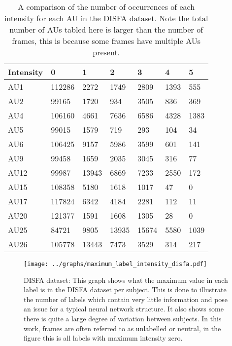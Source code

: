     \begin{table}[h!]
    \centering

    \begin{tabular}{lllllll}
    \hline
    Intensity & 0      & 1     & 2     & 3     & 4    & 5    \\ \hline
    AU1       & 112286 & 2272  & 1749  & 2809  & 1393 & 555  \\
    AU2       & 99165  & 1720  & 934   & 3505  & 836  & 369  \\
    AU4       & 106160 & 4661  & 7636  & 6586  & 4328 & 1383 \\
    AU5       & 99015  & 1579  & 719   & 293   & 104  & 34   \\
    AU6       & 106425 & 9157  & 5986  & 3599  & 601  & 141  \\
    AU9       & 99458  & 1659  & 2035  & 3045  & 316  & 77   \\
    AU12      & 99987  & 13943 & 6869  & 7233  & 2550 & 172  \\
    AU15      & 108358 & 5180  & 1618  & 1017  & 47   & 0    \\
    AU17      & 117824 & 6342  & 4184  & 2281  & 112  & 11   \\
    AU20      & 121377 & 1591  & 1608  & 1305  & 28   & 0    \\
    AU25      & 84721  & 9805  & 13935 & 15674 & 5580 & 1039 \\
    AU26      & 105778 & 13443 & 7473  & 3529  & 314  & 217  \\ \hline
    \end{tabular}
    \caption{A comparison of the number of occurrences of each intensity for each AU in the DISFA dataset. Note the total number
    of AUs tabled here is larger than the number of frames, this is because some frames have multiple AUs present.} \label{compau}
    \end{table}


    \begin{figure}[h!]
      \texttt{[image: ../graphs/maximum\_label\_intensity\_disfa.pdf]}
      \caption{DISFA dataset: This graph shows what the maximum value in each label is in the DISFA dataset per subject. This
      is done to illustrate the number of labels which contain very little information
      and pose an issue for a typical neural network structure. It also shows some there
      is quite a large degree of variation between subjects. In this work, frames are often referred to as unlabelled or neutral,
      in the figure this is all labels with maximum intensity zero.}\label{disfastats}
    \end{figure}

